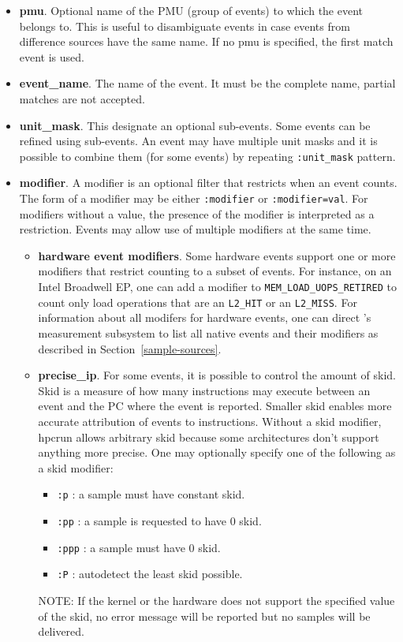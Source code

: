\begin{itemize}
	\item \textbf{pmu}.  Optional name of the PMU (group of events) to which the event belongs to. This is useful to disambiguate events in case events from difference sources have the same name. If no pmu is specified, the first match event is used.
	\item \textbf{event\_name}.  The name of the event. It must be the complete name, partial matches are not accepted. 
	\item \textbf{unit\_mask}.  This designate an optional sub-events. Some events can be refined using sub-events. An event may have multiple unit masks and it is possible to combine them (for some events) by repeating \texttt{:unit\_mask} pattern.
	\item \textbf{modifier}.  A modifier is an optional filter that restricts when an event counts.
                The form of a  modifier may be either \texttt{:modifier} or \texttt{:modifier=val}.
		For modifiers without a value, the presence of the modifier is 
                interpreted as a restriction. Events may allow use of multiple modifiers 
                at the same time.
		\begin{itemize}
		\item \textbf{hardware event modifiers}. Some hardware events support one or more modifiers that restrict counting to a subset of events. For instance, on an Intel Broadwell EP, one can add a modifier to \verb|MEM_LOAD_UOPS_RETIRED| to count only load operations that are 
an \verb|L2_HIT| or an \verb|L2_MISS|. For information about all modifers for hardware events, 
one can direct \HPCToolkit{}'s measurement subsystem to list all native events and their modifiers 
as described in Section~\ref{sample-sources}. 
		\item \textbf{precise\_ip}. For some events, it is possible to control the amount of skid. 
Skid is a measure of how many instructions may execute between an event and the PC where the event is reported. 
Smaller skid enables more accurate attribution of events to instructions. Without a skid modifier, hpcrun allows arbitrary skid because some architectures 
don't support anything more precise.  One may optionally specify one of the following as a skid modifier:
			\begin{itemize}
				\item \verb|:p| : a sample must have constant skid.
				\item \verb|:pp| :  a sample is requested to have 0 skid.
				\item \verb|:ppp| : a sample must have 0 skid.  
				\item \verb|:P| : autodetect the least skid possible.
			\end{itemize}
			NOTE: If the kernel or the hardware does not support the specified value of the skid, no error message will be reported 
but no samples will be delivered.
	\end{itemize}
\end{itemize}


